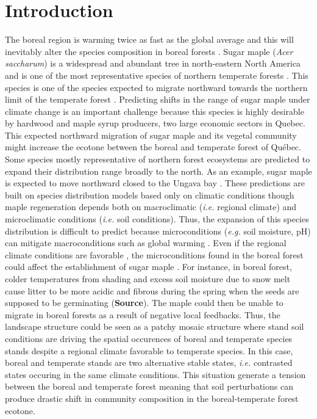 


\newpage
\setcounter{page}{1}

\section{Introduction}

The boreal region is warming twice as fast as the global
average and  this will inevitably alter the species composition in boreal
forests \cite{Scheffer2012,Hughes2000}. Sugar maple (\textit{Acer saccharum})
is a widespread and abundant tree in north-eastern North America and is one of
the most representative species of northern temperate forests
\cite{Graignic2013,Messaoud2007,Kellman2004,Barras1998}. This species is one
of the species expected to migrate northward towards the northern limit of the
temperate forest \cite{McKENNEY2007,Goldblum2005}. Predicting shifts in the
range of sugar maple under climate change is an important challenge because
this species is highly desirable by hardwood and maple syrup producers, two
large economic sectors in Quebec. This expected northward migration of sugar
maple and its vegetal community might increase the ecotone between the boreal
and temperate forest of Québec.\\

Some species mostly representative of northern forest ecosystems are predicted
to expand their distribution range broadly to the north. As an example, sugar
maple is expected to move northward closed to the Ungava bay
\cite{McKENNEY2007}. These predictions are built on species distribution models
based only on climatic conditions though maple regeneration depends both on
macroclimatic (\textit{i.e.} regional climate) and microclimatic conditions
(\textit{i.e.} soil conditions). Thus, the expansion of this species
distribution is difficult to predict because microconditions (\textit{e.g.}
soil moisture, pH) can mitigate macroconditions such as global warming
\cite{DeFrenne2013}. Even if the regional climate conditions are favorable
\cite{Kellman2004}, the microconditions found in the boreal forest could
affect the establishment of sugar maple
\cite{Kellman2004,Moore2008,DeFrenne2013,Barras1998}. For instance, in boreal
forest, colder temperatures from shading and excess soil moisture due to snow
melt cause litter to be more acidic and fibrous during the spring  when the
seeds are supposed to be germinating (\textbf{Source}). The maple could then
be unable to migrate in boreal forests as a result of negative local
feedbacks. Thus, the landscape structure could be seen as a patchy mosaic
structure where stand soil conditions are driving the spatial occurences of
boreal and temperate species stands despite a regional climate favorable to
temperate species. In this case, boreal and temperate stands are two
alternative stable states, \textit{i.e.} contrasted states occuring in the
same climate conditions. This situation generate a tension between the boreal
and temperate forest meaning that soil perturbations can produce drastic shift
in community composition in the boreal-temperate forest ecotone.

